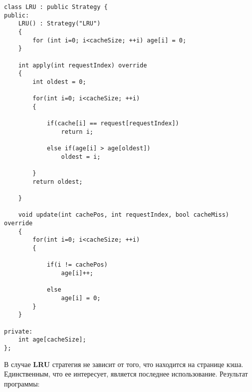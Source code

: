 \begin{tcolorbox}
\begin{verbatim}
class LRU : public Strategy {
public:
    LRU() : Strategy("LRU")
    {
        for (int i=0; i<cacheSize; ++i) age[i] = 0;
    }
    
    int apply(int requestIndex) override
    {
        int oldest = 0;
        
        for(int i=0; i<cacheSize; ++i)
        {
        
            if(cache[i] == request[requestIndex])
                return i;
            
            else if(age[i] > age[oldest])
                oldest = i;
        
        }
        return oldest;
        
    }
    
    void update(int cachePos, int requestIndex, bool cacheMiss) override
    {
        for(int i=0; i<cacheSize; ++i)
        {
        
            if(i != cachePos)
                age[i]++;
            
            else
                age[i] = 0;
        }
    }

private:
    int age[cacheSize];
};

\end{verbatim}
\end{tcolorbox}

В случае \textbf{LRU} стратегия не зависит от того, что находится на странице кэша. Единственным, что ее интересует, является последнее использование. Результат программы:

